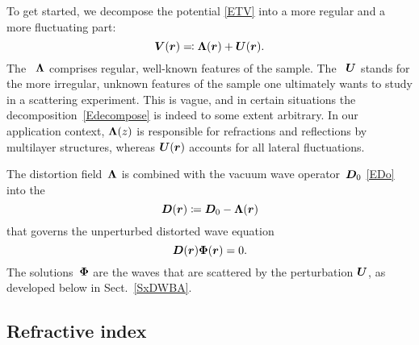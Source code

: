 To get started,
we decompose the potential \cref{ETV}
into a more regular and a more fluctuating part:
\begin{equation}\label{Edecompose}
  \TV(\r) \eqqcolon \TL(\r) + \TU(\r).
\end{equation}
The ~$\bm{\Lambda}$
%
%
comprises regular, well-known features of the sample.
The ~$\bm{U}$
%
%
%
stands for the more irregular, unknown features of the sample
one ultimately wants to study in a scattering experiment.
This is vague,
and in certain situations the decomposition~\cref{Edecompose} is indeed
to some extent arbitrary.
In our application context,
$\bm{\Lambda}(z)$ is responsible for refractions and reflections
by multilayer structures,
whereas $\bm{U}(\bm{r})$ accounts for all lateral fluctuations.

The distortion field~$\bm{\Lambda}$ is combined
with the vacuum wave operator~$\bm{D}_0$ \cref{EDo}
into the 
%
%
%
\begin{equation}
  \bm{D}(\bm{r}) \coloneqq \bm{D}_0 - \bm{\Lambda}(\bm{r})
\end{equation}
that governs the unperturbed distorted wave equation
%
%
%
\begin{equation}\label{EDPsi0}
  \TD(\r)\v\Phi(\r) = 0.
\end{equation}
The solutions~$\bm{\Phi}$ are the  waves
%
%
that are scattered by the perturbation $\bm{U}$,
as developed below in Sect.~\ref{SxDWBA}.

\subsection{Refractive index}\label{Sri1}

